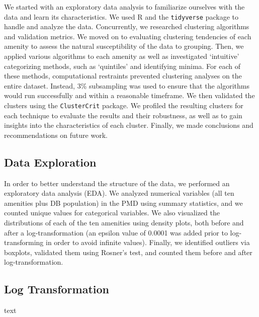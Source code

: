 \documentclass[11pt, a4paper]{article}
\begin{document}
We started with an exploratory data analysis to familiarize ourselves with the data and learn its characteristics. We used R and the \texttt{tidyverse} package to handle and analyze the data. Concurrently, we researched clustering algorithms and validation metrics. We moved on to evaluating clustering tendencies of each amenity to assess the natural susceptibility of the data to grouping. Then, we applied various algorithms to each amenity as well as investigated `intuitive' categorizing methods, such as `quintiles' and identifying minima. For each of these methods, computational restraints prevented clustering analyses on the entire dataset. Instead, 3\% subsampling was used to ensure that the algorithms would run successfully and within a reasonable timeframe. We then validated the clusters using the \texttt{ClusterCrit} package. We profiled the resulting clusters for each technique to evaluate the results and their robustness, as well as to gain insights into the characteristics of each cluster. Finally, we made conclusions and recommendations on future work.







\subsection{Data Exploration}


In order to better understand the structure of the data, we performed an exploratory data analysis (EDA). We analyzed numerical variables (all ten amenities plus DB population) in the PMD using summary statistics, and we counted unique values for categorical variables. We also visualized the distributions of each of the ten amenities using density plots, both before and after a log-transformation (an epsilon value of 0.0001 was added prior to log-transforming in order to avoid infinite values). Finally, we identified outliers via boxplots, validated them using Rosner's test, and counted them before and after log-transformation.




\subsection{Log Transformation}

text
\end{document}
